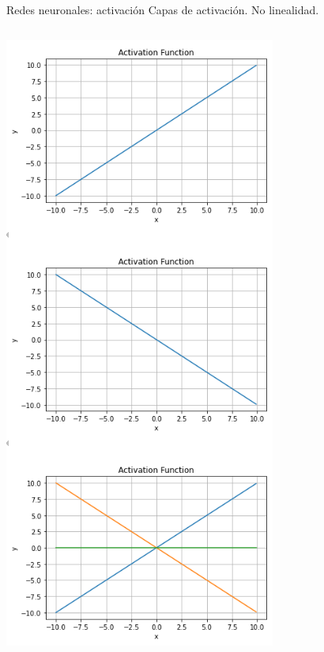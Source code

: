 \begin{frame}{Redes neuronales: activación}
Capas de activación. No linealidad.

\begin{columns}[c]
\centering
\begin{column}{0.3\textwidth}
    \centering
    \includegraphics[width=\textwidth]{Slides/figures/Introduccion/combilineal.png}

\end{column}
\end{columns}
\end{frame}
